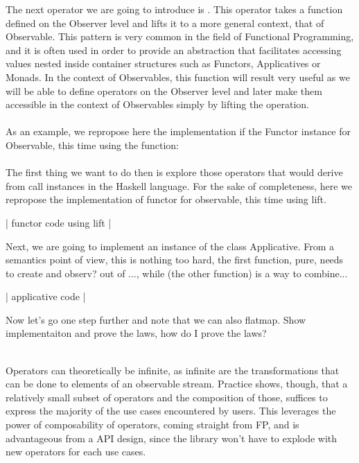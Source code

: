 The next operator we are going to introduce is . This operator takes a function defined on the Observer level and lifts it to a more general context, that of Observable. This pattern is very common in the field of Functional Programming, and it is often used in order to provide an abstraction that facilitates accessing values nested inside container structures such as Functors, Applicatives or Monads. In the context of Observables, this function will result very useful as we will be able to define operators on the Observer level and later make them accessible in the context of Observables simply by lifting the operation.\\

\\

As an example, we repropose here the implementation if the Functor instance for Observable, this time using the  function:\\

\\


The first thing we want to do then is explore those operators that would derive from call instances in the Haskell language. For the sake of completeness, here we repropose the implementation of functor for observable, this time using lift.

\hmint | functor code using lift |

Next, we are going to implement an instance of the class Applicative. From a semantics point of view, this is nothing too hard, the first function, pure, needs to create and observ? out of ..., while (the other function) is a way to combine...

\hmint | applicative code |

Now let's go one step further and note that we can also flatmap. Show implementaiton and prove the laws, how do I prove the laws?

\\

Operators can theoretically be infinite, as infinite are the transformations that can be done to elements of an observable stream. Practice shows, though, that a relatively small subset of operators and the composition of those, suffices to express the majority of the use cases encountered by users. This leverages the power of composability of operators, coming straight from FP, and is advantageous from a API design, since the library won't have to explode with new operators for each use cases.

